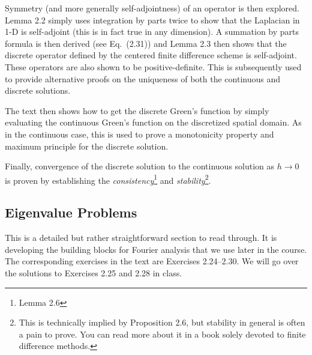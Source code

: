 \documentclass{amsart}
\theoremstyle{plain}
\theoremstyle{definition}
\theoremstyle{remark}
\theoremstyle{definition}
\numberwithin{equation}{section}
\numberwithin{equation}{section}
\begin{document}
Symmetry (and more generally self-adjointness) of an operator is then explored.
Lemma 2.2 simply uses integration by parts twice to show that the Laplacian in 1-D is self-adjoint (this is in fact true in any dimension). 
A summation by parts formula is then derived (see Eq.~(2.31)) and Lemma 2.3 then shows that the discrete operator defined by the centered finite difference scheme is self-adjoint. 
These operators are also shown to be positive-definite.
This is subsequently used to provide alternative proofs on the uniqueness of both the continuous and discrete solutions. 

The text then shows how to get the discrete Green's function by simply evaluating the continuous Green's function on the discretized spatial domain. 
As in the continuous case, this is used to prove a monotonicity property and maximum principle for the discrete solution. 

Finally, convergence of the discrete solution to the continuous solution as $h\to 0$ is proven by establishing the {\em consistency}\footnote{Lemma 2.6} and {\em stability}\footnote{This is technically implied by Proposition 2.6, but stability in general is often a pain to prove. You can read more about it in a book solely devoted to finite difference methods.}.


\subsection{Eigenvalue Problems}

This is a detailed but rather straightforward section to read through.
It is developing the building blocks for Fourier analysis that we use later in the course.
The corresponding exercises in the text are Exercises 2.24--2.30. 
We will go over the solutions to Exercises 2.25 and 2.28 in class. 
\end{document}
